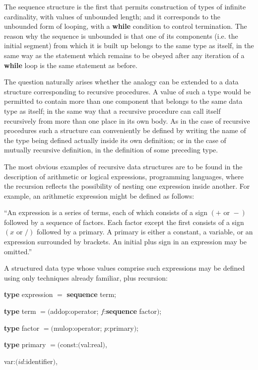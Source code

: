 The sequence structure is the first that permits construction of types of infinite cardinality, with values of unbounded length; and it corresponds to the unbounded form of looping, with a \textbf{while} condition to control termination. The reason why the sequence is unbounded is that one of its components (i.e. the initial segment) from which it is built up belongs to the same type as itself, in the same way as the statement which remains to be obeyed after any iteration of a \textbf{while} loop is the same statement as before.

The question naturally arises whether the analogy can be extended to a data structure corresponding to recursive procedures. A value of such a type would be permitted to contain more than one component that belongs to the same data type as itself; in the same way that a recursive procedure can call itself recursively from more than one place in its own body. As in the case of recursive procedures such a structure can conveniently be defined by writing the name of the type being defined actually inside its own definition; or in the case of mutually recursive definition, in the definition of some preceding type.

The most obvious examples of recursive data structures are to be found in the description of arithmetic or logical expressions, programming languages, where the recursion reflects the possibility of nesting one expression inside another. For example, an arithmetic expression might be defined as follows:

``An expression is a series of terms, each of which consists of a sign $(+ \text{ or } -)$ followed by a sequence of factors. Each factor except the first consists of a sign $(x \text{ or } /)$ followed by a primary. A primary is either a constant, a variable, or an expression surrounded by brackets. An initial plus sign in an expression may be omitted.''

A structured data type whose values comprise such expressions may be defined using only techniques already familiar, plus recursion:

\quad \textbf{type} expression $=$ \textbf{sequence} term;

\quad \textbf{type} term $= ($addop:operator; $f$:\textbf{sequence} factor$)$;

\quad \textbf{type} factor $= ($mulop:operator; $p$:primary$)$;

\quad \textbf{type} primary $= ($const:$($val:real$)$,

\tabto*{9.3em}var:$(id$:identifier$)$,

